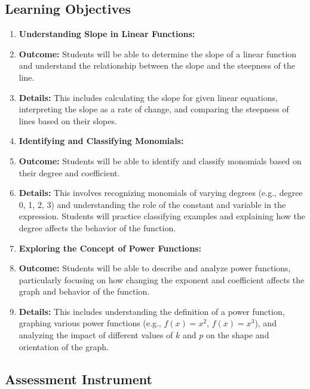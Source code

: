 \subsection{Learning Objectives}
\label{ssec:lear-fe6e}


\begin{enumerate}
    \item \textbf{Understanding Slope in Linear Functions:}
    \item \textbf{Outcome:} Students will be able to determine the slope of a linear function and understand the relationship between the slope and the steepness of the line.
    \item \textbf{Details:} This includes calculating the slope for given linear equations, interpreting the slope as a rate of change, and comparing the steepness of lines based on their slopes.
    \item \textbf{Identifying and Classifying Monomials:}
    \item \textbf{Outcome:} Students will be able to identify and classify monomials based on their degree and coefficient.
    \item \textbf{Details:} This involves recognizing monomials of varying degrees (e.g., degree 0, 1, 2, 3) and understanding the role of the constant and variable in the expression. Students will practice classifying examples and explaining how the degree affects the behavior of the function.
    \item \textbf{Exploring the Concept of Power Functions:}
    \item \textbf{Outcome:} Students will be able to describe and analyze power functions, particularly focusing on how changing the exponent and coefficient affects the graph and behavior of the function.
    \item \textbf{Details:} This includes understanding the definition of a power function, graphing various power functions (e.g., $f(x) = x^2$, $f(x) = x^3$), and analyzing the impact of different values of $k$ and $p$ on the shape and orientation of the graph.
\end{enumerate}


\subsection{Assessment Instrument}
\label{ssec:asse-3669}


